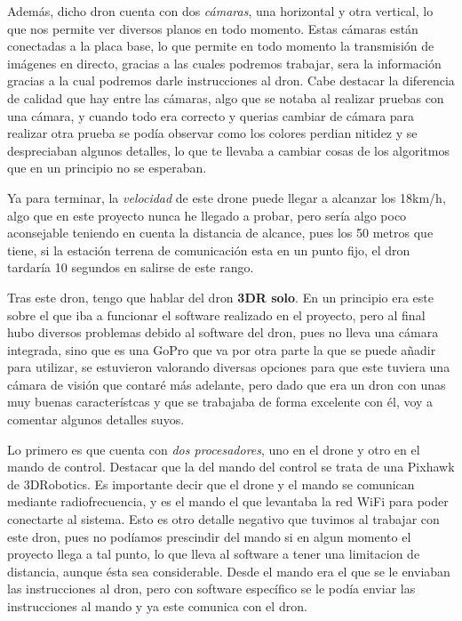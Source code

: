 \hspace{1 cm} Adem\'as, dicho dron cuenta con dos \textsl{c\'amaras}, una horizontal y otra vertical, lo que nos permite ver diversos planos en todo momento. Estas c\'amaras est\'an conectadas a la placa base, lo que permite en todo momento la transmisi\'on de im\'agenes en directo, gracias a las cuales podremos trabajar, sera la informaci\'on gracias a la cual podremos darle instrucciones al dron. Cabe destacar la diferencia de calidad que hay entre las c\'amaras, algo que se notaba al realizar pruebas con una c\'amara, y cuando todo era correcto y querias cambiar de c\'amara para realizar otra prueba se pod\'ia observar como los colores perdian nitidez y se despreciaban algunos detalles, lo que te llevaba a cambiar cosas de los algoritmos que en un principio no se esperaban. 

\hspace{1 cm} Ya para terminar, la \textsl{velocidad} de este drone puede llegar a alcanzar los 18km/h, algo que en este proyecto nunca he llegado a probar, pero ser\'ia algo poco aconsejable teniendo en cuenta la distancia de alcance, pues los 50 metros que tiene, si la estaci\'on terrena de comunicaci\'on esta en un punto fijo, el dron tardar\'ia 10 segundos en salirse de este rango. 

\hspace{1 cm} Tras este dron, tengo que hablar del dron \textbf{3DR solo}. En un principio era este sobre el que iba a funcionar el software realizado en el proyecto, pero al final hubo diversos problemas debido al software del dron, pues no lleva una c\'amara integrada, sino que es una GoPro que va por otra parte la que se puede añadir para utilizar, se estuvieron valorando diversas opciones para que este tuviera una c\'amara de visi\'on que contar\'e m\'as adelante, pero dado que era un dron con unas muy buenas caracter\'istcas y que se trabajaba de forma excelente con \'el, voy a comentar algunos detalles suyos. 

\hspace{1 cm} Lo primero es que cuenta con \textsl{dos procesadores}, uno en el drone y otro en el mando de control. Destacar que la del mando del control se trata de una Pixhawk de 3DRobotics. Es importante decir que el drone y el mando se comunican mediante radiofrecuencia, y es el mando el que levantaba la red WiFi para poder conectarte al sistema. Esto es otro detalle negativo que tuvimos al trabajar con este dron, pues no pod\'iamos prescindir del mando si en algun momento el proyecto llega a tal punto, lo que lleva al software a tener una limitacion de distancia, aunque \'esta sea considerable. Desde el mando era el que se le enviaban las instrucciones al dron, pero con software espec\'ifico se le pod\'ia enviar las instrucciones al mando y ya este comunica con el dron. 

